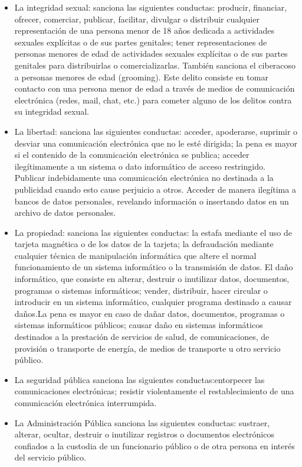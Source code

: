 \documentclass[a4paper,12pt]{article}
\begin{document}
    \begin{itemize}
        \item La integridad sexual: sanciona las siguientes conductas: producir, financiar, ofrecer, comerciar, publicar, facilitar, divulgar o distribuir cualquier representación de una persona menor de 18 años dedicada a actividades sexuales explícitas o de sus partes genitales; tener representaciones de personas menores de edad de actividades sexuales explícitas o de sus partes genitales para distribuirlas o comercializarlas. También sanciona el ciberacoso a personas menores de edad (grooming). Este delito consiste en tomar contacto con una persona menor de edad a través de medios de comunicación electrónica (redes, mail, chat, etc.) para cometer alguno de los delitos contra su integridad sexual.
        \item La libertad: sanciona las siguientes conductas: acceder, apoderarse, suprimir o desviar una comunicación electrónica que no le esté dirigida; la pena es mayor si el contenido de la comunicación electrónica se publica; acceder ilegítimamente a un sistema o dato informático de acceso restringido. Publicar indebidamente una comunicación electrónica no destinada a la publicidad cuando esto cause perjuicio a otros. Acceder de manera ilegítima a bancos de datos personales, revelando información o insertando datos en un archivo de datos personales.
        \item La propiedad:  sanciona las siguientes conductas: la estafa mediante el uso de tarjeta magnética o de los datos de la tarjeta; la defraudación mediante cualquier técnica de manipulación informática que altere el normal funcionamiento de un sistema informático o la transmisión de datos. El daño informático, que consiste en alterar, destruir o inutilizar datos, documentos, programas o sistemas informáticos; vender, distribuir, hacer circular o introducir en un sistema informático, cualquier programa destinado a causar daños.La pena es mayor en caso de dañar datos, documentos, programas o sistemas informáticos públicos; causar daño en sistemas informáticos destinados a la prestación de servicios de salud, de comunicaciones, de provisión o transporte de energía, de medios de transporte u otro servicio público.
        \item La seguridad pública sanciona las siguientes conductas:entorpecer las comunicaciones electrónicas; resistir violentamente el restablecimiento de una comunicación electrónica interrumpida.
        \item La Administración Pública sanciona las siguientes conductas: sustraer, alterar, ocultar, destruir o inutilizar registros o documentos electrónicos confiados a la custodia de un funcionario público o de otra persona en interés del servicio público.
    \end{itemize} 
\end{document}
